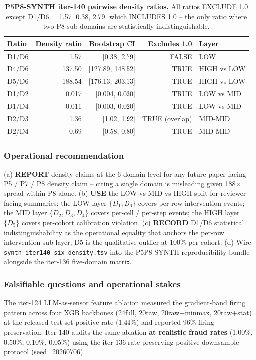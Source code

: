 \documentclass{article}
\begin{document}
\begin{table}[h]
\centering
\caption{\textbf{P5P8-SYNTH iter-140 pairwise density ratios.}
All ratios EXCLUDE 1.0 except D1/D6 = 1.57 [0.38, 2.79]
which INCLUDES 1.0 -- the only ratio where two P8 sub-domains
are statistically indistinguishable.}
\label{tab:p5p8synth-iter140-ratios}
\small
\begin{tabular}{lrrrl}
\toprule
Ratio & Density ratio & Bootstrap CI & Excludes 1.0 & Layer \\
\midrule
D1/D6 & 1.57   & [0.38, 2.79]   & FALSE  & LOW \\
D4/D6 & 137.50 & [127.89, 148.52] & TRUE   & HIGH vs LOW \\
D5/D6 & 188.54 & [176.13, 203.13] & TRUE   & HIGH vs LOW \\
D1/D2 & 0.017  & [0.004, 0.030]  & TRUE   & LOW vs MID \\
D1/D4 & 0.011  & [0.003, 0.020]  & TRUE   & LOW vs MID \\
D2/D3 & 1.36   & [1.02, 1.92]    & TRUE (overlap) & MID-MID \\
D2/D4 & 0.69   & [0.58, 0.80]    & TRUE   & MID-MID \\
\bottomrule
\end{tabular}
\end{table}

\subsubsection{Operational recommendation}
(a) \textbf{REPORT} density claims at the 6-domain level for any
future paper-facing P5 / P7 / P8 density claim -- citing a single
domain is misleading given 188$\times$ spread within P8 alone.
(b) \textbf{USE} the LOW vs MID vs HIGH split for reviewer-facing
summaries: the LOW layer $\{D_1, D_6\}$ covers per-row intervention
events; the MID layer $\{D_2, D_3, D_4\}$ covers per-cell / per-step
events; the HIGH layer $\{D_5\}$ covers per-cohort calibration
violation.  (c) \textbf{RECORD} D1/D6 statistical indistinguishability
as the operational equality that anchors the per-row intervention
sub-layer; D5 is the qualitative outlier at 100\% per-cohort.
(d) Wire \texttt{synth\_iter140\_six\_density.tsv} into the
P5P8-SYNTH reproducibility bundle alongside the iter-136 five-domain
matrix.
 

\subsubsection{Falsifiable questions and operational stakes}
The iter-124 LLM-as-sensor feature ablation measured the gradient-band
firing pattern across four XGB backbones (24full, 20raw,
20raw+minmax, 20raw+stat) at the released test-set positive rate
(1.44\%) and reported 96\% firing preservation.  Iter-140 audits
the same ablation \textbf{at realistic fraud rates} (1.00\%, 0.50\%,
0.10\%, 0.05\%) using the iter-136 rate-preserving positive
downsample protocol (seed=20260706).
\end{document}
